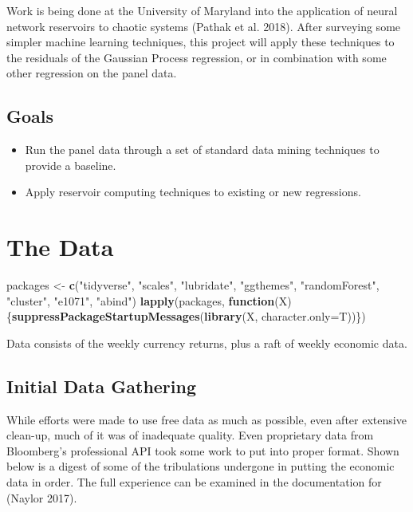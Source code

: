 \documentclass[]{article}
\newenvironment{Shaded}{\begin{snugshade}}{\end{snugshade}}
\newcommand{\KeywordTok}[1]{\textcolor[rgb]{0.13,0.29,0.53}{\textbf{#1}}}
\newcommand{\DataTypeTok}[1]{\textcolor[rgb]{0.13,0.29,0.53}{#1}}
\newcommand{\StringTok}[1]{\textcolor[rgb]{0.31,0.60,0.02}{#1}}
\newcommand{\ControlFlowTok}[1]{\textcolor[rgb]{0.13,0.29,0.53}{\textbf{#1}}}
\newcommand{\NormalTok}[1]{#1}
\providecommand{\tightlist}{%
  \setlength{\itemsep}{0pt}\setlength{\parskip}{0pt}}
\begin{document}
Work is being done at the University of Maryland into the application of
neural network reservoirs to chaotic systems (Pathak et al. 2018). After
surveying some simpler machine learning techniques, this project will
apply these techniques to the residuals of the Gaussian Process
regression, or in combination with some other regression on the panel
data.

\subsection{Goals}\label{goals}

\begin{itemize}
\tightlist
\item
  Run the panel data through a set of standard data mining techniques to
  provide a baseline.
\item
  Apply reservoir computing techniques to existing or new regressions.
\end{itemize}

\section{The Data}\label{the-data}

\begin{Shaded}
\begin{Highlighting}[]
\NormalTok{packages <-}\StringTok{ }\KeywordTok{c}\NormalTok{(}\StringTok{"tidyverse"}\NormalTok{, }\StringTok{"scales"}\NormalTok{, }\StringTok{"lubridate"}\NormalTok{, }\StringTok{"ggthemes"}\NormalTok{, }\StringTok{"randomForest"}\NormalTok{, }\StringTok{"cluster"}\NormalTok{, }\StringTok{"e1071"}\NormalTok{, }\StringTok{"abind"}\NormalTok{)}
\KeywordTok{lapply}\NormalTok{(packages, }\ControlFlowTok{function}\NormalTok{(X)\{}\KeywordTok{suppressPackageStartupMessages}\NormalTok{(}\KeywordTok{library}\NormalTok{(X, }\DataTypeTok{character.only=}\NormalTok{T))\})}
\end{Highlighting}
\end{Shaded}

Data consists of the weekly currency returns, plus a raft of weekly
economic data.

\subsection{Initial Data Gathering}\label{initial-data-gathering}

While efforts were made to use free data as much as possible, even after
extensive clean-up, much of it was of inadequate quality. Even
proprietary data from Bloomberg's professional API took some work to put
into proper format. Shown below is a digest of some of the tribulations
undergone in putting the economic data in order. The full experience can
be examined in the documentation for (Naylor 2017).
\end{document}
